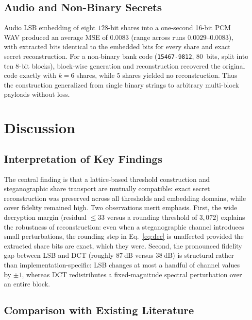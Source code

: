 \documentclass[preprint,12pt,number]{elsarticle}
\begin{document}
\subsection{Audio and Non-Binary Secrets}

Audio LSB embedding of eight $128$-bit shares into a one-second 16-bit PCM WAV
produced an average MSE of $0.0083$ (range across runs $0.0029$--$0.0083$), with
extracted bits identical to the embedded bits for every share and exact secret
reconstruction. For a non-binary bank code (\texttt{15467-9812}, $80$~bits,
split into ten $8$-bit blocks), block-wise generation and reconstruction
recovered the original code exactly with $k = 6$ shares, while $5$ shares
yielded no reconstruction. Thus the construction generalized from single binary
strings to arbitrary multi-block payloads without loss.

\section{Discussion}
\label{sec:discussion}

\subsection{Interpretation of Key Findings}

The central finding is that a lattice-based threshold construction and
steganographic share transport are mutually compatible: exact secret
reconstruction was preserved across all thresholds and embedding domains, while
cover fidelity remained high. Two observations merit emphasis. First, the wide
decryption margin (residual $\le 33$ versus a rounding threshold of $3{,}072$)
explains the robustness of reconstruction: even when a steganographic channel
introduces small perturbations, the rounding step in Eq.~\eqref{eq:dec} is
unaffected provided the extracted share bits are exact, which they were.
Second, the pronounced fidelity gap between LSB and DCT (roughly
$87~\mathrm{dB}$ versus $38~\mathrm{dB}$) is structural rather than
implementation-specific: LSB changes at most a handful of channel values by
$\pm1$, whereas DCT redistributes a fixed-magnitude spectral perturbation over
an entire block.

\subsection{Comparison with Existing Literature}
\end{document}
